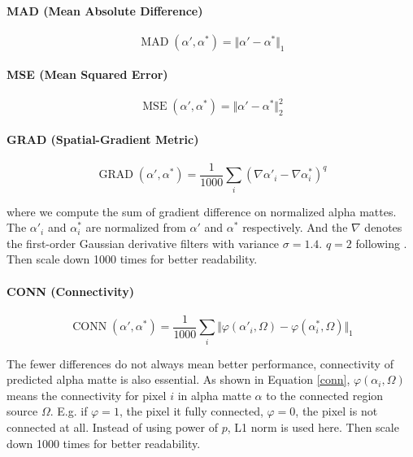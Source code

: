 \documentclass[final]{cvpr}
\begin{document}
\paragraph{MAD (Mean Absolute Difference)}

\begin{equation}\label{mad}
    \operatorname{MAD}(\alpha', \alpha^*)=\Vert\alpha'-\alpha^*\Vert_1
\end{equation}

\paragraph{MSE (Mean Squared Error)}

\begin{equation}\label{mse}
    \operatorname{MSE}(\alpha', \alpha^*)=\Vert\alpha'-\alpha^*\Vert_2^2
\end{equation}

\paragraph{GRAD (Spatial-Gradient Metric)}

\begin{equation}\label{grad}
    \operatorname{GRAD}(\alpha', \alpha^*)=\frac{1}{1000}\sum_i(\nabla \alpha'_i-\nabla \alpha^*_i)^q
\end{equation}

where we compute the sum of gradient difference on normalized alpha mattes.
The $\alpha'_i$ and $\alpha^*_i$ are normalized from $\alpha'$ and $\alpha^*$ respectively.
And the $\nabla$ denotes the first-order Gaussian derivative filters with variance $\sigma=1.4$. $q=2$ following \cite{linRealTimeHighResolutionBackground2020a}.
Then scale down 1000 times for better readability.

\paragraph{CONN (Connectivity)}

\begin{equation}\label{conn}
    \operatorname{CONN}(\alpha', \alpha^*)=\frac{1}{1000}\sum_i\Vert\varphi(\alpha'_i,\Omega)-\varphi(\alpha^*_i,\Omega)\Vert_1
\end{equation}

The fewer differences do not always mean better performance, connectivity of predicted alpha matte is also essential.
As shown in Equation \ref{conn}, $\varphi(\alpha_i,\Omega)$ means the connectivity for pixel $i$ in alpha matte $\alpha$ to the connected region source $\Omega$.
E.g. if $\varphi=1$, the pixel it fully connected, $\varphi=0$, the pixel is not connected at all. Instead of using power of $p$, L1 norm is used here.
Then scale down 1000 times for better readability.
\end{document}
